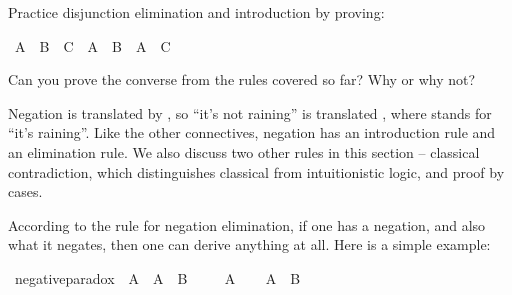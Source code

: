 \begin{isabellebody}
\isamarkupfalse%
%
\endisatagproof
{\isafoldproof}%
%
\isadelimproof
%
\endisadelimproof
%
\begin{isamarkuptext}%
\begin{Exercise}[label = disjEexercises] Practice disjunction elimination and introduction by proving: \end{Exercise}%
\end{isamarkuptext}\isamarkuptrue%
\isamarkupfalse%
\ {\isachardoublequoteopen}A\ {\isasymor}\ B\ {\isasymand}\ C\ {\isasymlongrightarrow}\ {\isacharparenleft}A\ {\isasymor}\ B{\isacharparenright}\ {\isasymand}\ {\isacharparenleft}A\ {\isasymor}\ C{\isacharparenright}{\isachardoublequoteclose}%
\isadelimproof
\ %
\endisadelimproof
%
\isatagproof
{}\isamarkupfalse%
%
\endisatagproof
{\isafoldproof}%
%
\isadelimproof
%
\endisadelimproof
%
\begin{isamarkuptext}%
Can you prove the converse from the rules covered so far? Why or why not?%
\end{isamarkuptext}\isamarkuptrue%
%
\isamarkuptrue%
%
\begin{isamarkuptext}%
Negation is translated by \isa{{\isasymnot}}, so ``it's not raining'' is translated ,
where  stands for ``it's raining''. Like the other connectives, negation has an introduction
rule and an elimination rule. We also discuss two other rules in this section -- classical contradiction,
which distinguishes classical from intuitionistic logic, and proof by cases.%
\end{isamarkuptext}\isamarkuptrue%
%
\isamarkuptrue%
%
\begin{isamarkuptext}%
According to the rule for negation elimination, if one has a negation, and also what it
negates, then one can derive anything at all. Here is a simple example:%
\end{isamarkuptext}\isamarkuptrue%
\isamarkupfalse%
\ negative{\isacharunderscore}paradox{\isacharcolon}\ {\isachardoublequoteopen}{\isasymnot}\ A\ {\isasymlongrightarrow}\ A\ {\isasymlongrightarrow}\ B{\isachardoublequoteclose}\isanewline
%
\isadelimproof
%
\endisadelimproof
%
\isatagproof
{}\isamarkupfalse%
\isanewline
\ \ \isamarkupfalse%
\ {\isachardoublequoteopen}{\isasymnot}\ A{\isachardoublequoteclose}\isanewline
\ \ \isamarkupfalse%
\ {\isachardoublequoteopen}A\ {\isasymlongrightarrow}\ B{\isachardoublequoteclose}\isanewline

\end{isabellebody}

